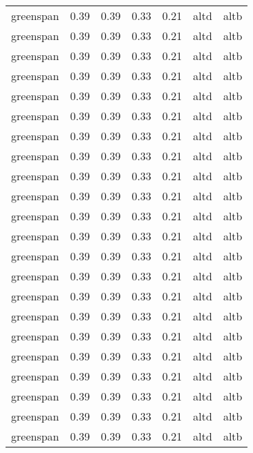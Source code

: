 \begin{tabular}{lrrrrll}
 greenspan &     0.39 &     0.39 &     0.33 &     0.21 &      altd &     altb \\
 greenspan &     0.39 &     0.39 &     0.33 &     0.21 &      altd &     altb \\
 greenspan &     0.39 &     0.39 &     0.33 &     0.21 &      altd &     altb \\
 greenspan &     0.39 &     0.39 &     0.33 &     0.21 &      altd &     altb \\
 greenspan &     0.39 &     0.39 &     0.33 &     0.21 &      altd &     altb \\
 greenspan &     0.39 &     0.39 &     0.33 &     0.21 &      altd &     altb \\
 greenspan &     0.39 &     0.39 &     0.33 &     0.21 &      altd &     altb \\
 greenspan &     0.39 &     0.39 &     0.33 &     0.21 &      altd &     altb \\
 greenspan &     0.39 &     0.39 &     0.33 &     0.21 &      altd &     altb \\
 greenspan &     0.39 &     0.39 &     0.33 &     0.21 &      altd &     altb \\
 greenspan &     0.39 &     0.39 &     0.33 &     0.21 &      altd &     altb \\
 greenspan &     0.39 &     0.39 &     0.33 &     0.21 &      altd &     altb \\
 greenspan &     0.39 &     0.39 &     0.33 &     0.21 &      altd &     altb \\
 greenspan &     0.39 &     0.39 &     0.33 &     0.21 &      altd &     altb \\
 greenspan &     0.39 &     0.39 &     0.33 &     0.21 &      altd &     altb \\
 greenspan &     0.39 &     0.39 &     0.33 &     0.21 &      altd &     altb \\
 greenspan &     0.39 &     0.39 &     0.33 &     0.21 &      altd &     altb \\
 greenspan &     0.39 &     0.39 &     0.33 &     0.21 &      altd &     altb \\
 greenspan &     0.39 &     0.39 &     0.33 &     0.21 &      altd &     altb \\
 greenspan &     0.39 &     0.39 &     0.33 &     0.21 &      altd &     altb \\
 greenspan &     0.39 &     0.39 &     0.33 &     0.21 &      altd &     altb \\
 greenspan &     0.39 &     0.39 &     0.33 &     0.21 &      altd &     altb \\

\end{tabular}
